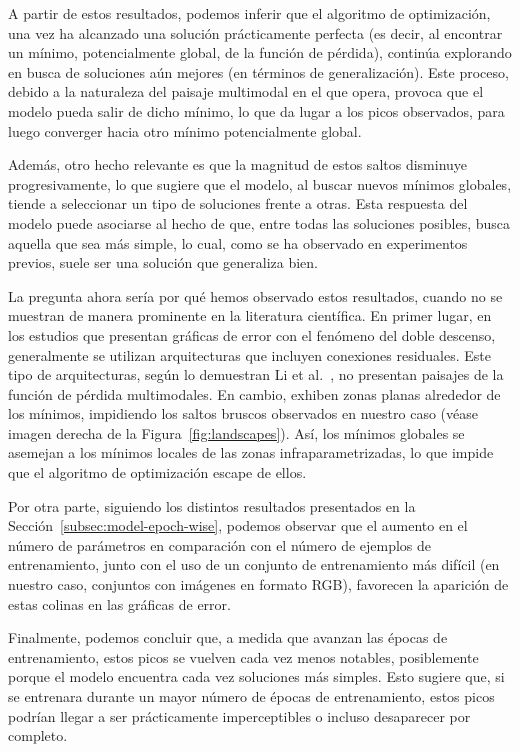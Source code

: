 A partir de estos resultados, podemos inferir que el algoritmo de optimización, una vez ha alcanzado una solución prácticamente perfecta (es decir, al encontrar un mínimo, potencialmente global, de la función de pérdida), continúa explorando en busca de soluciones aún mejores (en términos de generalización). Este proceso, debido a la naturaleza del paisaje multimodal en el que opera, provoca que el modelo pueda salir de dicho mínimo, lo que da lugar a los picos observados, para luego converger hacia otro mínimo potencialmente global.\newline

Además, otro hecho relevante es que la magnitud de estos saltos disminuye progresivamente, lo que sugiere que el modelo, al buscar nuevos mínimos globales, tiende a seleccionar un tipo de soluciones frente a otras. Esta respuesta del modelo puede asociarse al hecho de que, entre todas las soluciones posibles, busca aquella que sea más simple, lo cual, como se ha observado en experimentos previos, suele ser una solución que generaliza bien.\newline

La pregunta ahora sería por qué hemos observado estos resultados, cuando no se muestran de manera prominente en la literatura científica. En primer lugar, en los estudios que presentan gráficas de error con el fenómeno del doble descenso, generalmente se utilizan arquitecturas que incluyen conexiones residuales. Este tipo de arquitecturas, según lo demuestran Li et al.~\cite{Li2018}, no presentan paisajes de la función de pérdida multimodales. En cambio, exhiben zonas planas alrededor de los mínimos, impidiendo los saltos bruscos observados en nuestro caso (véase imagen derecha de la Figura~\ref{fig:landscapes}). Así, los mínimos globales se asemejan a los mínimos locales de las zonas infraparametrizadas, lo que impide que el algoritmo de optimización escape de ellos.\newline

Por otra parte, siguiendo los distintos resultados presentados en la Sección~\ref{subsec:model-epoch-wise}, podemos observar que el aumento en el número de parámetros en comparación con el número de ejemplos de entrenamiento, junto con el uso de un conjunto de entrenamiento más difícil (en nuestro caso, conjuntos con imágenes en formato RGB), favorecen la aparición de estas colinas en las gráficas de error.\newline

Finalmente, podemos concluir que, a medida que avanzan las épocas de entrenamiento, estos picos se vuelven cada vez menos notables, posiblemente porque el modelo encuentra cada vez soluciones más simples. Esto sugiere que, si se entrenara durante un mayor número de épocas de entrenamiento, estos picos podrían llegar a ser prácticamente imperceptibles o incluso desaparecer por completo.\newline

\endinput

